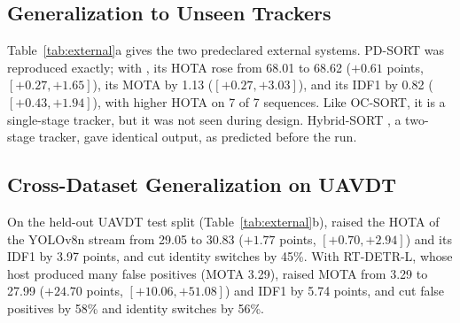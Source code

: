 \subsection{Generalization to Unseen Trackers}\label{sec:external}
Table~\ref{tab:external}a gives the two predeclared external systems. PD-SORT \cite{wang2025pdsort}
was reproduced exactly; with \scl{}, its HOTA rose from 68.01 to 68.62 ($+0.61$ points,
$[+0.27,+1.65]$), its MOTA by 1.13 ($[+0.27,+3.03]$), and its IDF1 by 0.82 ($[+0.43,+1.94]$), with
higher HOTA on 7 of 7 sequences. Like OC-SORT, it is a single-stage tracker, but it was not seen
during design. Hybrid-SORT \cite{yang2024hybridsort}, a two-stage tracker, gave identical output, as
predicted before the run.



\subsection{Cross-Dataset Generalization on UAVDT}\label{sec:visdrone}
On the held-out UAVDT test split (Table~\ref{tab:external}b), \scl{} raised the HOTA of the YOLOv8n
stream from 29.05 to 30.83 ($+1.77$ points, $[+0.70,+2.94]$) and its IDF1 by 3.97 points, and cut
identity switches by 45\%. With RT-DETR-L, whose host produced many false positives (MOTA 3.29),
\scl{} raised MOTA from 3.29 to 27.99 ($+24.70$ points, $[+10.06,+51.08]$) and IDF1 by 5.74 points,
and cut false positives by 58\% and identity switches by 56\%.
